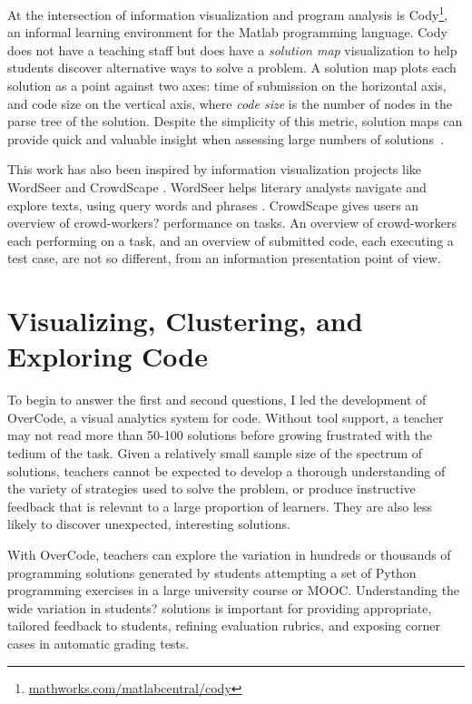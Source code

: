 \documentclass{sigchi}
\begin{document}
At the intersection of information visualization and program analysis is Cody\footnote{\url{mathworks.com/matlabcentral/cody}}, an informal learning environment for the Matlab programming language. Cody does not have a teaching staff but does have a {\em solution map} visualization to help students discover alternative ways to solve a problem. A solution map plots each solution as a point against two axes: time of submission on the horizontal axis, and code size on the vertical axis, where \textit{code size} is the number of nodes in the parse tree of the solution. Despite the simplicity of this metric, solution maps can provide quick and valuable insight when assessing large numbers of solutions~\cite{ICERGlassman}.

This work has also been inspired by information visualization projects like WordSeer \cite{wordseerlitcomp13,wordseercikm13} and CrowdScape \cite{crowdscape}. WordSeer helps literary analysts navigate and explore texts, using query words and phrases \cite{wordseerhcir11}. CrowdScape gives users an overview of crowd-workers? performance on tasks. An overview of crowd-workers each performing on a task, and an overview of submitted code, each executing a test case, are not so different, from an information presentation point of view.

\section{Visualizing, Clustering, and Exploring Code}
To begin to answer the first and second questions, I led the development of OverCode, a visual analytics system for code. Without tool support, a teacher may not read more than 50-100 solutions before growing frustrated with the tedium of the task. Given a relatively small sample size of the spectrum of solutions, teachers cannot be expected to develop a thorough understanding of the variety of strategies used to solve the problem, or produce instructive feedback that is relevant to a large proportion of learners. They are also less likely to discover unexpected, interesting solutions.

With OverCode, teachers can explore the variation in hundreds or thousands of programming solutions generated by students attempting a set of Python programming exercises in a large university course or MOOC. Understanding the wide variation in students? solutions is important for providing appropriate, tailored feedback to students, refining evaluation rubrics, and exposing corner cases in automatic grading tests.
\end{document}
